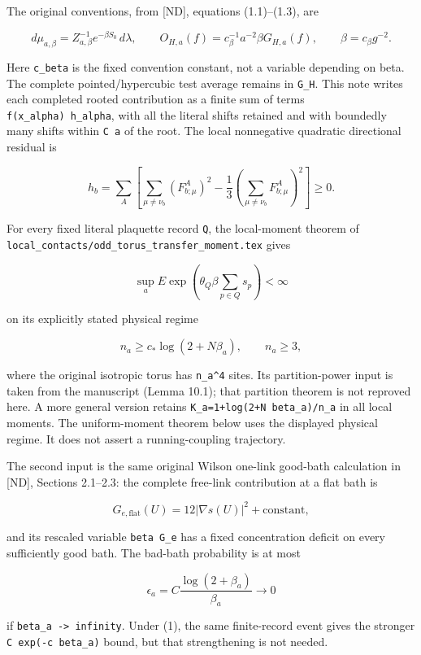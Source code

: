 \documentclass[
  11pt,
]{article}
\begin{document}
The original conventions, from [ND], equations (1.1)--(1.3), are

\[
 d\mu_{a,\beta}=Z_{a,\beta}^{-1}e^{-\beta S_0}\,d\lambda,
 \qquad O_{H,a}(f)=c_\beta^{-1}a^{-2}\beta G_{H,a}(f),
 \qquad \beta=c_\beta g^{-2}.
\]

Here \texttt{c\_beta} is the fixed convention constant, not a variable
depending on beta. The complete pointed/hypercubic test average remains
in \texttt{G\_H}. This note writes each completed rooted contribution as
a finite sum of terms \texttt{f(x\_alpha)\ h\_alpha}, with all the
literal shifts retained and with boundedly many shifts within
\texttt{C\ a} of the root. The local nonnegative quadratic directional
residual is

\[
 h_b=\sum_A\left[\sum_{\mu\ne\nu_b}(F^A_{b;\mu})^2
             -\frac13\left(\sum_{\mu\ne\nu_b}F^A_{b;\mu}\right)^2\right]\ge0.
\]

For every fixed literal plaquette record \texttt{Q}, the
local-moment theorem of \texttt{local\_contacts/odd\_torus\_transfer\_moment.tex} gives

\[
 \sup_a E\exp\left(\theta_Q\beta\sum_{p\in Q}s_p\right)<\infty
 \tag{1}
\]

on its explicitly stated physical regime

\[
 n_a\ge c_*\log(2+N\beta_a),\qquad n_a\ge3,
\]

where the original isotropic torus has \texttt{n\_a\^{}4} sites. Its partition-power input is
taken from the manuscript (Lemma 10.1); that partition theorem is not
reproved here. A
more general version retains \texttt{K\_a=1+log(2+N\ beta\_a)/n\_a} in
all local moments. The uniform-moment theorem below uses the displayed
physical regime. It does not assert a running-coupling trajectory.

The second input is the same original Wilson one-link good-bath
calculation in [ND], Sections 2.1--2.3: the complete
free-link contribution at a flat bath is

\[
 G_{e,\mathrm{flat}}(U)=12|\nabla s(U)|^2+\text{constant},
\]

and its rescaled variable \texttt{beta\ G\_e} has a fixed concentration
deficit on every sufficiently good bath. The bad-bath probability is at
most

\[
 \epsilon_a=C\frac{\log(2+\beta_a)}{\beta_a}\longrightarrow0
 \tag{2}
\]

if \texttt{beta\_a\ -\textgreater{}\ infinity}. Under (1), the same
finite-record event gives the stronger \texttt{C\ exp(-c\ beta\_a)}
bound, but that strengthening is not needed.
\end{document}
